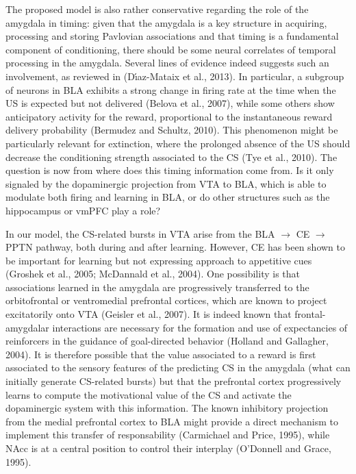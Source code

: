 \documentclass[
  11pt,
  a4paper,
]{scrbook}
\begin{document}
The proposed model is also rather conservative regarding the role of the
amygdala in timing: given that the amygdala is a key structure in
acquiring, processing and storing Pavlovian associations and that timing
is a fundamental component of conditioning, there should be some neural
correlates of temporal processing in the amygdala. Several lines of
evidence indeed suggests such an involvement, as reviewed in
(Dı́az-Mataix et al., 2013). In particular, a subgroup of neurons in BLA
exhibits a strong change in firing rate at the time when the US is
expected but not delivered (Belova et al., 2007), while some others show
anticipatory activity for the reward, proportional to the instantaneous
reward delivery probability (Bermudez and Schultz, 2010). This
phenomenon might be particularly relevant for extinction, where the
prolonged absence of the US should decrease the conditioning strength
associated to the CS (Tye et al., 2010). The question is now from where
does this timing information come from. Is it only signaled by the
dopaminergic projection from VTA to BLA, which is able to modulate both
firing and learning in BLA, or do other structures such as the
hippocampus or vmPFC play a role?

In our model, the CS-related bursts in VTA arise from the BLA
\(\rightarrow\) CE \(\rightarrow\) PPTN pathway, both during and after
learning. However, CE has been shown to be important for learning but
not expressing approach to appetitive cues (Groshek et al., 2005;
McDannald et al., 2004). One possibility is that associations learned in
the amygdala are progressively transferred to the orbitofrontal or
ventromedial prefrontal cortices, which are known to project
excitatorily onto VTA (Geisler et al., 2007). It is indeed known that
frontal-amygdalar interactions are necessary for the formation and use
of expectancies of reinforcers in the guidance of goal-directed behavior
(Holland and Gallagher, 2004). It is therefore possible that the value
associated to a reward is first associated to the sensory features of
the predicting CS in the amygdala (what can initially generate
CS-related bursts) but that the prefrontal cortex progressively learns
to compute the motivational value of the CS and activate the
dopaminergic system with this information. The known inhibitory
projection from the medial prefrontal cortex to BLA might provide a
direct mechanism to implement this transfer of responsability
(Carmichael and Price, 1995), while NAcc is at a central position to
control their interplay (O'Donnell and Grace, 1995).
\end{document}
